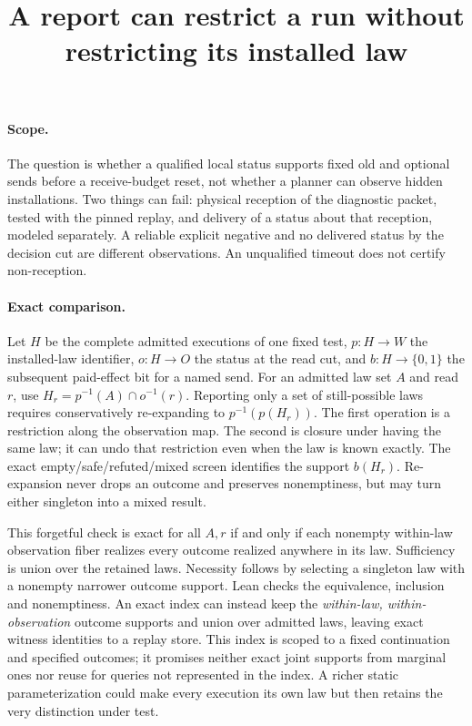 \documentclass[11pt]{article}
\title{A report can restrict a run without restricting its installed law}
\date{}
\begin{document}
\maketitle

\paragraph{Scope.}
The question is whether a qualified local status supports fixed old and
optional sends before a receive-budget reset, not whether a planner can
observe hidden installations. Two things can fail: physical reception of
the diagnostic packet, tested with the pinned replay, and delivery of a
status about that reception, modeled separately. A reliable explicit
negative and no delivered status by the decision cut are different
observations. An unqualified timeout does not certify non-reception.

\paragraph{Exact comparison.}
Let $H$ be the complete admitted executions of one fixed test, $p:H\to W$
the installed-law identifier, $o:H\to O$ the status at the read cut, and
$b:H\to\{0,1\}$ the subsequent paid-effect bit for a named send. For an
admitted law set $A$ and read $r$, use
$H_r=p^{-1}(A)\cap o^{-1}(r)$. Reporting only a set of still-possible laws
requires conservatively re-expanding to $p^{-1}(p(H_r))$. The first
operation is a restriction along the observation map. The second is closure
under having the same law; it can undo that restriction even when the law
is known exactly. The exact empty/safe/refuted/mixed screen identifies the
support $b(H_r)$. Re-expansion never drops an outcome and preserves
nonemptiness, but may turn either singleton into a mixed result.

This forgetful check is exact for all $A,r$ if and only if each nonempty
within-law observation fiber realizes every outcome realized anywhere in
its law. Sufficiency is union over the retained laws. Necessity follows
by selecting a singleton law with a nonempty narrower outcome support.
Lean checks the equivalence, inclusion and nonemptiness. An exact index
can instead keep the \emph{within-law, within-observation} outcome supports
and union over admitted laws, leaving exact witness identities to a replay
store. This index is scoped to a fixed continuation and specified outcomes;
it promises neither exact joint supports from marginal ones nor reuse for
queries not represented in the index. A richer static parameterization
could make every execution its own law but then retains the very distinction
under test.
\end{document}
